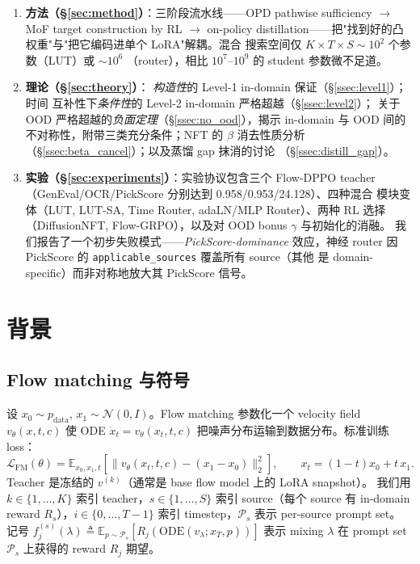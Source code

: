\documentclass[11pt,a4paper]{article}
\newcommand{\loss}{\mathcal{L}}
\newcommand{\E}{\mathbb{E}}
\newcommand{\N}{\mathcal{N}}
\theoremstyle{definition}
\begin{document}
\begin{enumerate}[leftmargin=1.5em]
\item \textbf{方法（\S\ref{sec:method}）}：三阶段流水线——OPD pathwise
sufficiency $\to$ MoF target construction by RL $\to$ on-policy
distillation——把"找到好的凸权重"与"把它编码进单个 LoRA"解耦。混合
搜索空间仅 $K\times T\times S \sim 10^2$ 个参数（LUT）或 $\sim 10^6$
（router），相比 $10^7$--$10^9$ 的 student 参数微不足道。

\item \textbf{理论（\S\ref{sec:theory}）}：
\emph{构造性}的 Level-1 in-domain 保证（\S\ref{ssec:level1}）；时间
互补性下\emph{条件性}的 Level-2 in-domain 严格超越（\S\ref{ssec:level2}）；
关于 OOD 严格超越的\emph{负面定理}（\S\ref{ssec:no_ood}），揭示 in-domain
与 OOD 间的不对称性，附带三类充分条件；NFT 的 $\beta$ 消去性质分析
（\S\ref{ssec:beta_cancel}）；以及蒸馏 gap 抹消的讨论
（\S\ref{ssec:distill_gap}）。

\item \textbf{实验（\S\ref{sec:experiments}）}：实验协议包含三个 Flow-DPPO
teacher（GenEval/OCR/PickScore 分别达到 0.958/0.953/24.128）、四种混合
模块变体（LUT, LUT-SA, Time Router, adaLN/MLP Router）、两种 RL 选择
（DiffusionNFT, Flow-GRPO），以及对 OOD bonus $\gamma$ 与初始化的消融。
我们报告了一个初步失败模式——\emph{PickScore-dominance} 效应，神经
router 因 PickScore 的 \texttt{applicable\_sources} 覆盖所有 source（其他
是 domain-specific）而非对称地放大其 PickScore 信号。
\end{enumerate}

\section{背景}
\label{sec:background}

\subsection{Flow matching 与符号}

设 $x_0 \sim p_{\text{data}}$, $x_1 \sim \N(0, I)$。Flow matching
参数化一个 velocity field $v_\theta(x, t, c)$ 使 ODE
$\dot x_t = v_\theta(x_t, t, c)$ 把噪声分布运输到数据分布。标准训练
loss：
\begin{equation}
\loss_{\text{FM}}(\theta) = \E_{x_0,x_1,t}\!\left[
\big\| v_\theta(x_t,t,c) - (x_1 - x_0) \big\|_2^2
\right],\qquad x_t = (1-t) x_0 + t\,x_1.
\label{eq:fm}
\end{equation}
Teacher 是冻结的 $v^{(k)}$（通常是 base flow model 上的 LoRA snapshot）。
我们用 $k \in \{1, \ldots, K\}$ 索引 teacher，$s \in \{1, \ldots, S\}$
索引 source（每个 source 有 in-domain reward $R_s$），$i \in \{0, \ldots,
T-1\}$ 索引 timestep，$\mathcal{P}_s$ 表示 per-source prompt set。
记号 $f_j^{(s)}(\lambda) \triangleq
\E_{p \sim \mathcal{P}_s}[R_j(\mathrm{ODE}(v_\lambda; x_T, p))]$
表示 mixing $\lambda$ 在 prompt set $\mathcal{P}_s$ 上获得的 reward $R_j$
期望。
\end{document}
